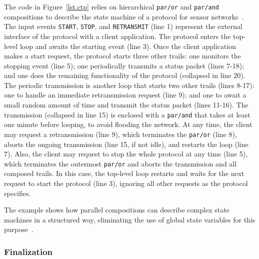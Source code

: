 \documentclass{acm_proc_article-sp}
\newcommand{\code}[1] {{\small{\texttt{#1}}}}
\newcommand{\1}{\;}
\newcommand{\2}{\;\;}
\newcommand{\3}{\;\;\;}
\newcommand{\5}{\;\;\;\;\;}
\begin{document}
The code in Figure~\ref{lst.ctp} relies on hierarchical \code{par/or} and 
\code{par/and} compositions to describe the state machine of a protocol for 
sensor networks~\cite{wsn.ctp,ceu.sensys13}.
%
The input events \code{START}, \code{STOP}, and \code{RETRANSMIT} (line 1) 
represent the external interface of the protocol with a client application.
%
The protocol enters the top-level loop and awaits the starting event (line 3).
Once the client application makes a start request, the protocol starts three 
other trails:
one monitors the stopping event (line 5);
one periodically transmits a status packet (lines 7-18);
and one does the remaining functionality of the protocol (collapsed in line 
20).
%
The periodic transmission is another loop that starts two other trails (lines 
8-17):
one to handle an immediate retransmission request (line 9);
and one to await a small random amount of time and transmit the status packet 
(lines 11-16).
%
The transmission (collapsed in line 15) is enclosed with a \code{par/and} that 
takes at least one minute before looping, to avoid flooding the network.
%
At any time, the client may request a retransmission (line 9), which terminates 
the \code{par/or} (line 8), aborts the ongoing transmission (line 15, if not 
idle), and restarts the loop (line 7).
%
Also, the client may request to stop the whole protocol at any time (line 5), 
which terminates the outermost \code{par/or} and aborts the transmission and 
all composed trails.
In this case, the top-level loop restarts and waits for the next request to 
start the protocol (line 3), ignoring all other requests as the protocol 
specifies.

The example shows how parallel compositions can describe complex state machines 
in a structured way, eliminating the use of global state variables for this 
purpose~\cite{ceu.sensys13}.

\subsubsection{Finalization}
\end{document}
